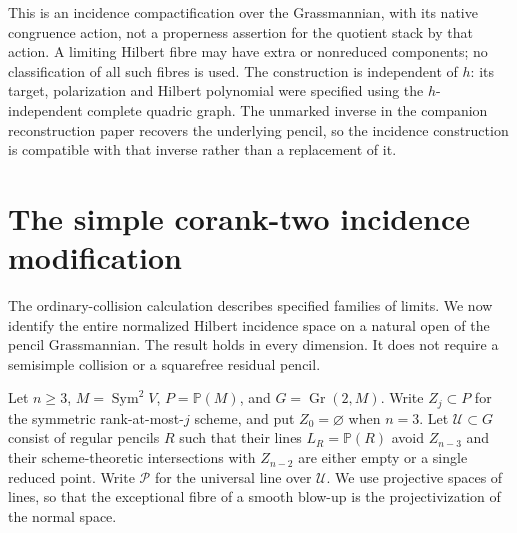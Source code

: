 \documentclass[11pt,reqno]{amsart}
\numberwithin{equation}{section}
\theoremstyle{definition}\newtheorem{definition}[theorem]{Definition}
\theoremstyle{remark}\newtheorem{remark}[theorem]{Remark}
\newcommand{\Pj}{\mathbb P}\newcommand{\A}{\mathbb A}
\DeclareMathOperator{\Sym}{Sym}\DeclareMathOperator{\Gr}{Gr}
\begin{document}
This is an incidence compactification over the Grassmannian, with its
native congruence action, not a properness assertion for the quotient
stack by that action. A limiting Hilbert fibre may have extra or
nonreduced components; no classification of all such fibres is used.
The construction is independent of $h$: its target, polarization and
Hilbert polynomial were specified using the $h$-independent complete
quadric graph. The unmarked inverse in the companion reconstruction
paper recovers the underlying pencil, so the incidence construction is
compatible with that inverse rather than a replacement of it.


\section{The simple corank-two incidence modification}
\label{sec:incidence-blowup-v160}
The ordinary-collision calculation describes specified families of
limits. We now identify the entire normalized Hilbert incidence space
on a natural open of the pencil Grassmannian. The result holds in every
dimension. It does not require a semisimple collision or a squarefree
residual pencil.

Let $n\geq3$, $M=\Sym^2V$, $P=\Pj(M)$, and $G=\Gr(2,M)$.
Write $Z_j\subset P$ for the symmetric rank-at-most-$j$ scheme, and
put $Z_0=\varnothing$ when $n=3$. Let $\mathcal U\subset G$ consist
of regular pencils $R$ such that their lines $L_R=\Pj(R)$ avoid
$Z_{n-3}$ and their scheme-theoretic intersections with $Z_{n-2}$
are either empty or a single reduced point. Write $\mathcal P$ for
the universal line over $\mathcal U$. We use projective spaces of
lines, so that the exceptional fibre of a smooth blow-up is the
projectivization of the normal space.
\end{document}
